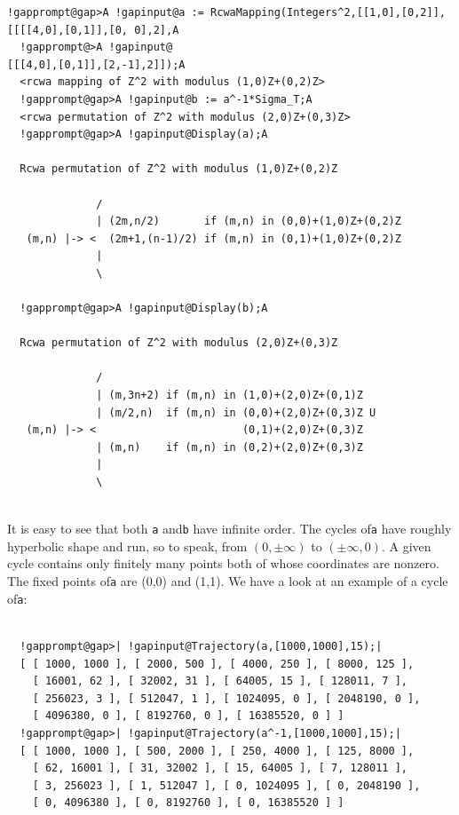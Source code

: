 \documentclass[a4paper,11pt]{report}
\begin{document}
{{\begin{Verbatim}[commandchars=!@A,fontsize=\small,frame=single,label=Example]
  !gapprompt@gap>A !gapinput@a := RcwaMapping(Integers^2,[[1,0],[0,2]],[[[[4,0],[0,1]],[0, 0],2],A
  !gapprompt@>A !gapinput@                                              [[[4,0],[0,1]],[2,-1],2]]);A
  <rcwa mapping of Z^2 with modulus (1,0)Z+(0,2)Z>
  !gapprompt@gap>A !gapinput@b := a^-1*Sigma_T;A
  <rcwa permutation of Z^2 with modulus (2,0)Z+(0,3)Z>
  !gapprompt@gap>A !gapinput@Display(a);A
  
  Rcwa permutation of Z^2 with modulus (1,0)Z+(0,2)Z
  
              /
              | (2m,n/2)       if (m,n) in (0,0)+(1,0)Z+(0,2)Z
   (m,n) |-> <  (2m+1,(n-1)/2) if (m,n) in (0,1)+(1,0)Z+(0,2)Z
              |
              \
  
  !gapprompt@gap>A !gapinput@Display(b);A
  
  Rcwa permutation of Z^2 with modulus (2,0)Z+(0,3)Z
  
              /
              | (m,3n+2) if (m,n) in (1,0)+(2,0)Z+(0,1)Z
              | (m/2,n)  if (m,n) in (0,0)+(2,0)Z+(0,3)Z U 
   (m,n) |-> <                       (0,1)+(2,0)Z+(0,3)Z
              | (m,n)    if (m,n) in (0,2)+(2,0)Z+(0,3)Z
              |
              \
  
\end{Verbatim}
 It is easy to see that both \texttt{a} and{\nobreakspace}\texttt{b} have infinite order. The cycles of{\nobreakspace}\texttt{a} have roughly hyperbolic shape and run, so to speak, from $(0,\pm \infty)$ to $(\pm \infty,0)$. A given cycle contains only finitely many points both of whose coordinates
are nonzero. The fixed points of{\nobreakspace}\texttt{a} are (0,0) and (\texttt{}1,\texttt{}1). We have a look at
an example of a cycle of{\nobreakspace}\texttt{a}: 
\begin{Verbatim}[commandchars=!@|,fontsize=\small,frame=single,label=Example]
  
  !gapprompt@gap>| !gapinput@Trajectory(a,[1000,1000],15);|
  [ [ 1000, 1000 ], [ 2000, 500 ], [ 4000, 250 ], [ 8000, 125 ], 
    [ 16001, 62 ], [ 32002, 31 ], [ 64005, 15 ], [ 128011, 7 ], 
    [ 256023, 3 ], [ 512047, 1 ], [ 1024095, 0 ], [ 2048190, 0 ], 
    [ 4096380, 0 ], [ 8192760, 0 ], [ 16385520, 0 ] ]
  !gapprompt@gap>| !gapinput@Trajectory(a^-1,[1000,1000],15);|
  [ [ 1000, 1000 ], [ 500, 2000 ], [ 250, 4000 ], [ 125, 8000 ], 
    [ 62, 16001 ], [ 31, 32002 ], [ 15, 64005 ], [ 7, 128011 ], 
    [ 3, 256023 ], [ 1, 512047 ], [ 0, 1024095 ], [ 0, 2048190 ], 
    [ 0, 4096380 ], [ 0, 8192760 ], [ 0, 16385520 ] ]
  

\end{Verbatim}}}
\end{document}
